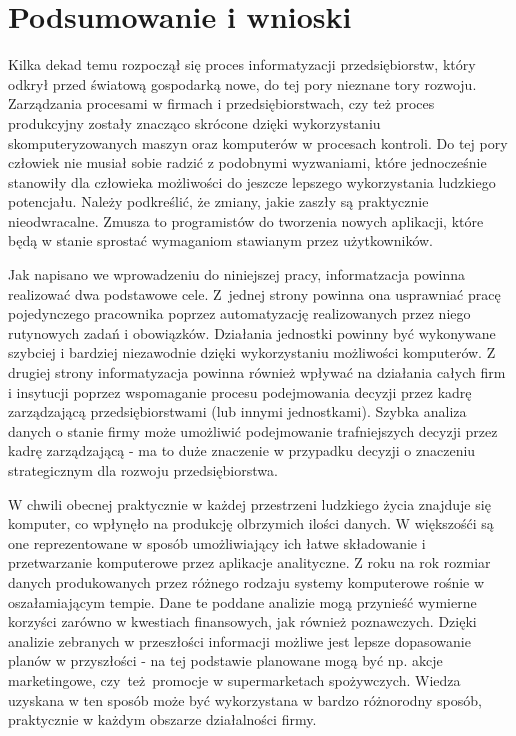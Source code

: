 \chapter{Podsumowanie i wnioski\label{chap:zakonczenie}}

Kilka dekad temu rozpoczął się proces informatyzacji przedsiębiorstw, który odkrył przed światową gospodarką nowe, do tej pory nieznane tory rozwoju. Zarządzania procesami w firmach i przedsiębiorstwach, czy też proces produkcyjny zostały znacząco skrócone dzięki wykorzystaniu skomputeryzowanych maszyn oraz komputerów w procesach kontroli. Do tej pory człowiek nie musiał sobie radzić z podobnymi wyzwaniami, które jednocześnie stanowiły dla człowieka możliwości do jeszcze lepszego wykorzystania ludzkiego potencjału. Należy podkreślić, że zmiany, jakie zaszły są praktycznie nieodwracalne. Zmusza to programistów do tworzenia nowych aplikacji, które będą w stanie sprostać wymaganiom stawianym przez użytkowników.

Jak napisano we wprowadzeniu do niniejszej pracy, informatzacja powinna realizować dwa podstawowe cele. Z~jednej strony powinna ona usprawniać pracę pojedynczego pracownika poprzez automatyzację realizowanych przez niego rutynowych zadań i obowiązków. Działania jednostki powinny być wykonywane szybciej i bardziej niezawodnie dzięki wykorzystaniu możliwości komputerów. Z drugiej strony informatyzacja powinna również wpływać na działania całych firm i insytucji poprzez wspomaganie procesu podejmowania decyzji przez kadrę zarządzającą przedsiębiorstwami (lub innymi jednostkami). Szybka analiza danych o stanie firmy może umożliwić podejmowanie trafniejszych decyzji przez kadrę zarządzającą - ma to duże znaczenie w przypadku decyzji o znaczeniu strategicznym dla rozwoju przedsiębiorstwa.

W chwili obecnej praktycznie w każdej przestrzeni ludzkiego życia znajduje się komputer, co wpłynęło na produkcję olbrzymich ilości danych. W większośći są one reprezentowane w sposób umożliwiający ich łatwe składowanie i przetwarzanie komputerowe przez aplikacje analityczne. Z roku na rok rozmiar danych produkowanych przez różnego rodzaju systemy komputerowe rośnie w oszałamiającym tempie. Dane te poddane analizie mogą przynieść wymierne korzyści zarówno w kwestiach finansowych, jak również poznawczych. Dzięki analizie zebranych w przeszłości informacji możliwe jest lepsze dopasowanie planów w przyszłości - na tej podstawie planowane mogą być np. akcje marketingowe, czy~też~promocje w supermarketach spożywczych. Wiedza uzyskana w ten sposób może być wykorzystana w bardzo różnorodny sposób, praktycznie w każdym obszarze działalności firmy.

